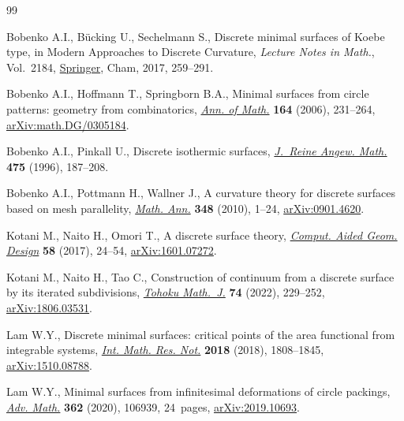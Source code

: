 \documentclass[10pt,a4paper]{amsart}
\newcommand{\1}{{\bf 1}}
\numberwithin{equation}{section}
\begin{document}
\begin{thebibliography}{99}
\footnotesize\itemsep=0pt

Bobenko A.I., B\"ucking U., Sechelmann S., Discrete minimal surfaces of {K}oebe
  type, in Modern {A}pproaches to {D}iscrete {C}urvature, \textit{Lecture Notes
  in Math.}, Vol.~2184,  \href{https://doi.org/10.1007/978-3-319-58002-9_8}{Springer}, Cham, 2017, 259--291.

Bobenko A.I., Hoffmann T., Springborn B.A., Minimal surfaces from circle
  patterns: geometry from combinatorics, \href{https://doi.org/10.4007/annals.2006.164.231}{\textit{Ann. of Math.}} \textbf{164}
  (2006), 231--264, \href{https://arxiv.org/abs/math.DG/0305184}{arXiv:math.DG/0305184}.

Bobenko A.I., Pinkall U., Discrete isothermic surfaces,  \href{https://doi.org/10.1515/crll.1996.475.187}{\textit{J.~Reine Angew.
  Math.}} \textbf{475} (1996), 187--208.

Bobenko A.I., Pottmann H., Wallner J., A curvature theory for discrete surfaces
  based on mesh parallelity,  \href{https://doi.org/10.1007/s00208-009-0467-9}{\textit{Math. Ann.}} \textbf{348} (2010), 1--24,
  \href{https://arxiv.org/abs/0901.4620}{arXiv:0901.4620}.

Kotani M., Naito H., Omori T., A discrete surface theory, \href{https://doi.org/10.1016/j.cagd.2017.09.002}{\textit{Comput. Aided
  Geom. Design}} \textbf{58} (2017), 24--54, \href{https://arxiv.org/abs/1601.07272}{arXiv:1601.07272}.

Kotani M., Naito H., Tao C., Construction of continuum from a discrete surface
  by its iterated subdivisions, \href{https://doi.org/10.2748/tmj.20201225}{\textit{Tohoku Math.~J.}} \textbf{74} (2022),
  229--252, \href{https://arxiv.org/abs/1806.03531}{arXiv:1806.03531}.

Lam W.Y., Discrete minimal surfaces: critical points of the area functional
  from integrable systems, \href{https://doi.org/10.1093/imrn/rnw267}{\textit{Int. Math. Res. Not.}} \textbf{2018} (2018),
  1808--1845, \href{https://arxiv.org/abs/1510.08788}{arXiv:1510.08788}.

Lam W.Y., Minimal surfaces from infinitesimal deformations of circle packings,
  \href{https://doi.org/10.1016/j.aim.2019.106939}{\textit{Adv. Math.}} \textbf{362} (2020), 106939, 24~pages,
  \href{https://arxiv.org/abs/2019.10693}{arXiv:2019.10693}.


\end{thebibliography}
\end{document}
